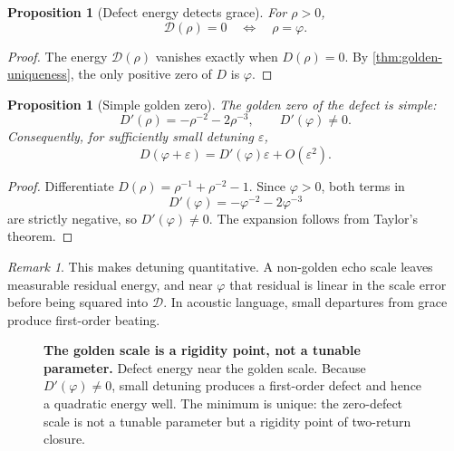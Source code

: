 \documentclass[11pt,a4paper]{article}
\theoremstyle{plain}
\newtheorem{proposition}[theorem]{Proposition}
\theoremstyle{definition}
\theoremstyle{remark}
\newtheorem{remark}[theorem]{Remark}
\numberwithin{equation}{section}
\newcommand{\vp}{\varphi}
\begin{document}
\begin{proposition}[Defect energy detects grace]
\label{prop:defect-energy-detects-phi}
For \(\rho>0\),
\[
  \mathcal D(\rho)=0
  \quad\Longleftrightarrow\quad
  \rho=\vp.
\]
\end{proposition}

\begin{proof}
The energy \(\mathcal D(\rho)\) vanishes exactly when
\(D(\rho)=0\).  By \cref{thm:golden-uniqueness}, the only positive zero
of \(D\) is \(\vp\).
\end{proof}

\begin{proposition}[Simple golden zero]
\label{prop:simple-golden-zero}
The golden zero of the defect is simple:
\[
  D'(\rho)=-\rho^{-2}-2\rho^{-3},
  \qquad
  D'(\vp)\ne0.
\]
Consequently, for sufficiently small detuning \(\varepsilon\),
\[
  D(\vp+\varepsilon)
  =
  D'(\vp)\varepsilon+O(\varepsilon^2).
\]
\end{proposition}

\begin{proof}
Differentiate \(D(\rho)=\rho^{-1}+\rho^{-2}-1\).  Since
\(\vp>0\), both terms in
\[
  D'(\vp)=-\vp^{-2}-2\vp^{-3}
\]
are strictly negative, so \(D'(\vp)\ne0\).  The expansion follows from
Taylor's theorem.
\end{proof}

\begin{remark}
This makes detuning quantitative.  A non-golden echo scale leaves
measurable residual energy, and near \(\vp\) that residual is linear in
the scale error before being squared into \(\mathcal D\).  In acoustic
language, small departures from grace produce first-order beating.
\end{remark}

\begin{figure}[ht]
\centering
{}
\caption{\textbf{The golden scale is a rigidity point, not a tunable parameter.}
Defect energy near the golden scale.  Because \(D'(\varphi)\ne0\),
small detuning produces a first-order defect and hence a quadratic energy
well.  The minimum is unique: the zero-defect scale is not a tunable
parameter but a rigidity point of two-return closure.}
\label{fig:defect-energy-well}
\end{figure}
\end{document}

